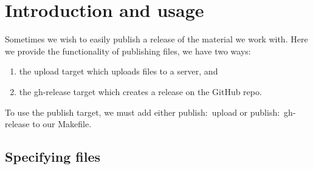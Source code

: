 \section{Introduction and usage}%

Sometimes we wish to easily publish a release of the material we work with.
Here we provide the functionality of publishing files, we have two ways:
\begin{enumerate}
\item the {\Tt{}upload\nwendquote} target which uploads files to a server, and
\item the {\Tt{}gh-release\nwendquote} target which creates a release on the GitHub repo.
\end{enumerate}
To use the {\Tt{}publish\nwendquote} target, we must add either {\Tt{}publish:\ upload\nwendquote} or 
{\Tt{}publish:\ gh-release\nwendquote} to our {\Tt{}Makefile\nwendquote}.

\subsection{Specifying files}

